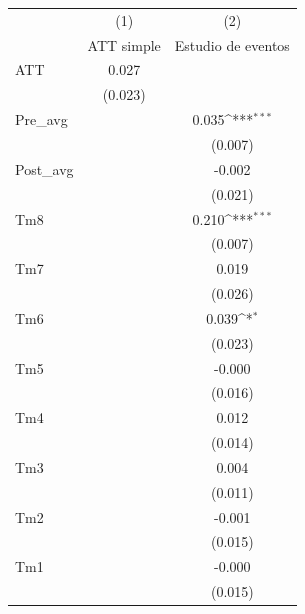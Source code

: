 {
\def\sym#1{\ifmmode^{#1}\else\(^{#1}\)\fi}
\begin{tabular}{l*{2}{c}}
\toprule
            &\multicolumn{1}{c}{(1)}&\multicolumn{1}{c}{(2)}\\
            &\multicolumn{1}{c}{ATT simple}&\multicolumn{1}{c}{Estudio de eventos}\\
\midrule
ATT         &       0.027         &                     \\
            &     (0.023)         &                     \\
\addlinespace
Pre\_avg     &                     &       0.035\sym{***}\\
            &                     &     (0.007)         \\
\addlinespace
Post\_avg    &                     &      -0.002         \\
            &                     &     (0.021)         \\
\addlinespace
Tm8         &                     &       0.210\sym{***}\\
            &                     &     (0.007)         \\
\addlinespace
Tm7         &                     &       0.019         \\
            &                     &     (0.026)         \\
\addlinespace
Tm6         &                     &       0.039\sym{*}  \\
            &                     &     (0.023)         \\
\addlinespace
Tm5         &                     &      -0.000         \\
            &                     &     (0.016)         \\
\addlinespace
Tm4         &                     &       0.012         \\
            &                     &     (0.014)         \\
\addlinespace
Tm3         &                     &       0.004         \\
            &                     &     (0.011)         \\
\addlinespace
Tm2         &                     &      -0.001         \\
            &                     &     (0.015)         \\
\addlinespace
Tm1         &                     &      -0.000         \\
            &                     &     (0.015)         \\

\end{tabular}}

